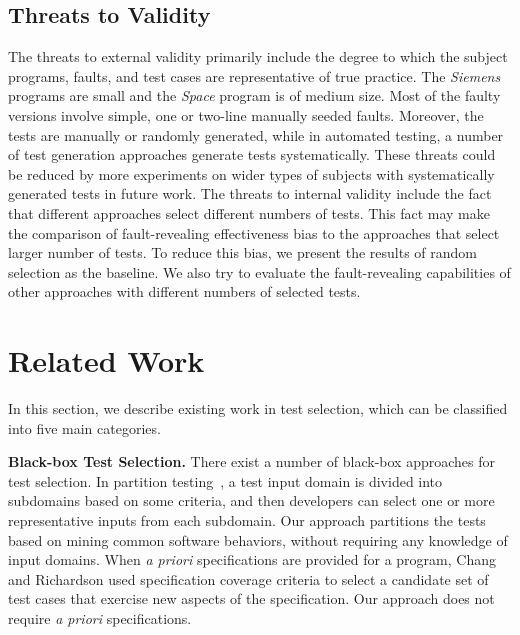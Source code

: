 \documentclass{sig-alternate}
\begin{document}
\subsection{Threats to Validity}
The threats to external validity primarily include the degree to
which the subject programs, faults, and test cases are
representative of true practice. The \emph{Siemens} programs are
small and the \emph{Space} program is of medium size. Most of the
faulty versions involve simple, one or two-line manually seeded
faults. Moreover, the tests are manually or randomly generated,
while in automated testing, a number of test generation approaches
generate tests systematically. These threats could be reduced by
more experiments on wider types of subjects with systematically
generated tests in future work. The threats to internal validity
include the fact that different approaches select different numbers
of tests. This fact may make the comparison of fault-revealing
effectiveness bias to the approaches that select larger number of
tests. To reduce this bias, we present the results of random
selection as the baseline. We also try to evaluate the
fault-revealing capabilities of other approaches with different
numbers of selected tests.



\section{Related Work} \label{sec:relatedwork}

In this section, we describe existing work in test selection, which
can be classified into five main categories.



\textbf{Black-box Test Selection.} There exist a number of
black-box approaches for test selection. In partition
testing~\cite{Myers79}, a test input domain is divided into
subdomains based on some criteria, and then developers can select
one or more representative inputs from each subdomain. Our approach
partitions the tests based on mining common software behaviors,
without requiring any knowledge of input domains. When \emph{a
priori} specifications are provided for a program, Chang and
Richardson \cite{Chang99} used specification coverage criteria to
select a candidate set of test cases that exercise new aspects of
the specification. Our approach does not require \emph{a priori}
specifications.

\end{document}
